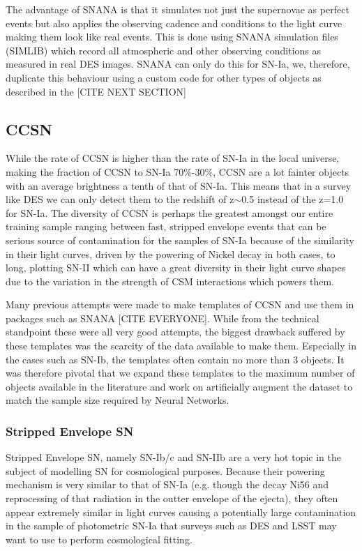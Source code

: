 The advantage of SNANA is that it simulates not just the supernovae as perfect events but also applies the observing cadence and conditions to the light curve making them look like real events. This is done using SNANA simulation files (SIMLIB) which record all atmospheric and other observing conditions as measured in real DES images. SNANA can only do this for SN-Ia, we, therefore, duplicate this behaviour using a custom code for other types of objects as described in the [CITE NEXT SECTION]

\subsection{CCSN}
While the rate of CCSN is higher than the rate of SN-Ia in the local universe, making the fraction of CCSN to SN-Ia 70\%-30\%, CCSN are a lot fainter objects with an average brightness a tenth of that of SN-Ia. This means that in a survey like DES we can only detect them to the redshift of z$\sim$0.5 instead of the z=1.0 for SN-Ia. The diversity of CCSN is perhaps the greatest amongst our entire training sample ranging between fast, stripped envelope events that can be serious source of contamination for the samples of SN-Ia because of the similarity in their light curves, driven by the powering of Nickel decay in both cases, to long, plotting SN-II which can have a great diversity in their light curve shapes due to the variation in the strength of CSM interactions which powers them.

Many previous attempts were made to make templates of CCSN and use them in packages such as SNANA [CITE EVERYONE]. While from the technical standpoint these were all very good attempts, the biggest drawback suffered by these templates was the scarcity of the data available to make them. Especially in the cases such as SN-Ib, the templates often contain no more than 3 objects. It was therefore pivotal that we expand these templates to the maximum number of objects available in the literature and work on artificially augment the dataset to match the sample size required by Neural Networks.

\subsubsection{Stripped Envelope SN}
Stripped Envelope SN, namely SN-Ib/c and SN-IIb are a very hot topic in the subject of modelling SN for cosmological purposes. Because their powering mechanism is very similar to that of SN-Ia (e.g. though the decay Ni56 and reprocessing of that radiation in the outter envelope of the ejecta), they often appear extremely similar in light curves causing a potentially large contamination in the sample of photometric SN-Ia that surveys such as DES and LSST may want to use to perform cosmological fitting.

